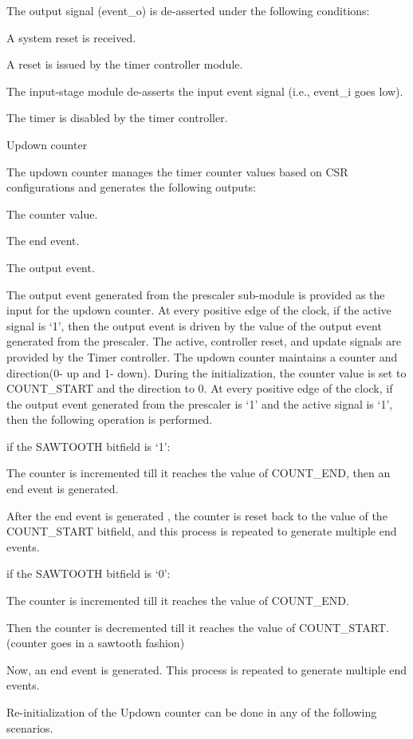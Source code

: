 The output signal (event_o) is de-asserted under the following conditions:

    A system reset is received.

    A reset is issued by the timer controller module.

    The input-stage module de-asserts the input event signal (i.e., event_i goes low).

    The timer is disabled by the timer controller.

Updown counter

The updown counter manages the timer counter values based on CSR configurations and generates the following outputs:

    The counter value.

    The end event.

    The output event.

The output event generated from the prescaler sub-module is provided as the input for the updown counter. At every positive edge of the clock, if the active signal is ‘1’, then the output event is driven by the value of the output event generated from the prescaler. The active, controller reset, and update signals are provided by the Timer controller. The updown counter maintains a counter and direction(0- up and 1- down). During the initialization, the counter value is set to COUNT_START and the direction to 0. At every positive edge of the clock, if the output event generated from the prescaler is ‘1’ and the active signal is ‘1’, then the following operation is performed.

    if the SAWTOOTH bitfield is ‘1’:

        The counter is incremented till it reaches the value of COUNT_END, then an end event is generated.

        After the end event is generated , the counter is reset back to the value of the COUNT_START bitfield, and this process is repeated to generate multiple end events.

    if the SAWTOOTH bitfield is ‘0’:

        The counter is incremented till it reaches the value of COUNT_END.

        Then the counter is decremented till it reaches the value of COUNT_START. (counter goes in a sawtooth fashion)

        Now, an end event is generated. This process is repeated to generate multiple end events.

Re-initialization of the Updown counter can be done in any of the following scenarios.

